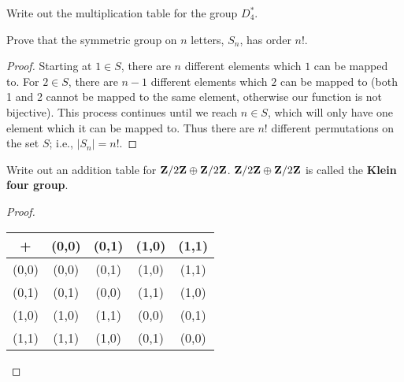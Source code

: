     \begin{exercise}
        Write out the multiplication table for the group $D_4^\ast$.
    \end{exercise}
    
    \begin{exercise}
        Prove that the symmetric group on $n$ letters, $S_n$, has order $n!$.
    \end{exercise}
        {\color{blue} \begin{proof}
            Starting at $1 \in S$, there are $n$ different elements which $1$ can be mapped to. For $2 \in S$, there are $n-1$ different elements which $2$ can be mapped to (both 1 and 2 cannot be mapped to the same element, otherwise our function is not bijective). This process continues until we reach $n \in S$, which will only have one element which it can be mapped to. Thus there are $n!$ different permutations on the set $S$; i.e., $|S_n| = n!$.
        \end{proof}}
    
    \begin{exercise}
        Write out an addition table for $\mathbf{Z}/2\mathbf{Z} \oplus \mathbf{Z}/2\mathbf{Z}$. $\mathbf{Z}/2\mathbf{Z} \oplus \mathbf{Z}/2\mathbf{Z}$ is called the \textbf{Klein four group}.
    \end{exercise}
        {\color{blue} \begin{proof}
            \phantom{a}
                \begin{center}
                \begin{tabular}{ c| c | c | c | c |}
                + & (0,0) & (0,1) & (1,0) & (1,1) \\
                \hline
                (0,0) & (0,0) & (0,1) & (1,0) & (1,1) \\ 
                \hline
                (0,1) & (0,1) & (0,0) & (1,1) & (1,0) \\ 
                \hline
                (1,0) & (1,0) & (1,1) & (0,0) & (0,1) \\ 
                \hline
                (1,1) & (1,1) & (1,0) & (0,1) & (0,0) \\ 
                \hline
                \end{tabular}
                \end{center}
        \end{proof}}
    
